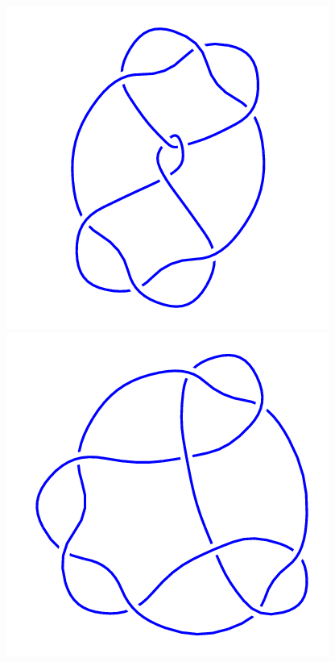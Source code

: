 \begin{figure}[H]
	\begin{minipage}[b]{.18\linewidth}
		\centering
		\includegraphics[width=\linewidth]{../data/9_16.png}
	\end{minipage}
	\begin{minipage}[b]{.18\linewidth}
		\centering
		\includegraphics[width=\linewidth]{../data/9_17.png}

\end{minipage}
\end{figure}
